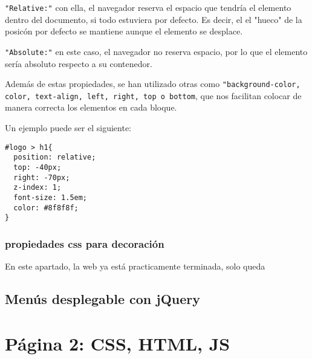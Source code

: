 \documentclass[10pt,a4paper]{article}
\begin{document}
\texttt{"Relative:"} con ella, el navegador reserva el espacio que tendría el elemento dentro
del documento, si todo estuviera por defecto. Es decir, el el "hueco" de la posicón por
defecto se mantiene aunque el elemento se desplace.

\texttt{"Absolute:"} en este caso, el navegador no reserva espacio, por lo que el elemento sería absoluto respecto a su contenedor.

Además de estas propiedades, se han utilizado otras como \texttt{"background-color, color, text-align, left, right, top o bottom}, que nos facilitan colocar de manera correcta los elementos en cada bloque.

Un ejemplo puede ser el siguiente:

\begin{verbatim}
#logo > h1{
  position: relative;
  top: -40px;
  right: -70px;
  z-index: 1;
  font-size: 1.5em;
  color: #8f8f8f;
}
\end{verbatim}

\subsubsection{propiedades css para decoración}

En este apartado, la web ya está practicamente terminada, solo queda 

\subsection{Menús desplegable con jQuery}

\section{Página 2: CSS, HTML, JS}
\end{document}
